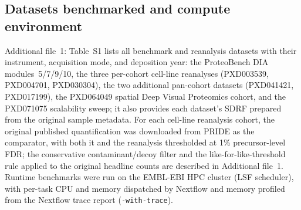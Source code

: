 \subsection{Datasets benchmarked and compute environment}
\label{sec:datasets}
Additional file~1: Table~S1 lists all benchmark and reanalysis datasets with their instrument, acquisition mode, and deposition year: the ProteoBench DIA modules~5/7/9/10, the three per-cohort cell-line reanalyses (PXD003539, PXD004701, PXD030304), the two additional pan-cohort datasets (PXD041421, PXD017199), the PXD064049 spatial Deep Visual Proteomics cohort, and the PXD071075 scalability sweep; it also provides each dataset's SDRF prepared from the original sample metadata.
For each cell-line reanalysis cohort, the original published quantification was downloaded from PRIDE as the comparator, with both it and the \quantmsdiann{} reanalysis thresholded at 1\% precursor-level FDR; the conservative contaminant/decoy filter and the like-for-like-threshold rule applied to the original headline counts are described in Additional file~1.
Runtime benchmarks were run on the EMBL-EBI HPC cluster (LSF scheduler), with per-task CPU and memory dispatched by Nextflow and memory profiled from the Nextflow trace report (\texttt{-with-trace}).

